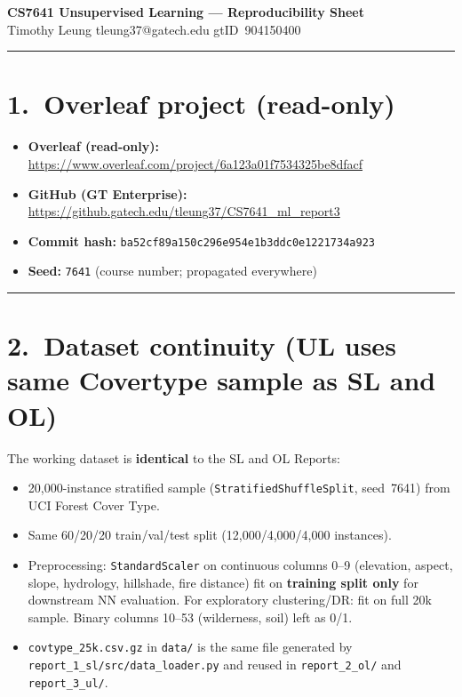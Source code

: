 \documentclass[11pt]{article}
\begin{document}
{\Large\bfseries\color{denimdark}
CS7641 Unsupervised Learning --- Reproducibility Sheet}\\[4pt]
{\large\color{denimmid}
Timothy Leung \quad tleung37@gatech.edu \quad gtID~904150400}\\[2pt]
{\color{denimmid}\rule{\linewidth}{0.6pt}}

\section*{1.\ Overleaf project (read-only)}
\begin{itemize}
  \item \textbf{Overleaf (read-only):}
        \url{https://www.overleaf.com/project/6a123a01f7534325be8dfacf}
  \item \textbf{GitHub (GT Enterprise):}
        \url{https://github.gatech.edu/tleung37/CS7641_ml_report3}
  \item \textbf{Commit hash:} \texttt{ba52cf89a150c296e954e1b3ddc0e1221734a923}
  \item \textbf{Seed:} \texttt{7641} (course number; propagated everywhere)
\end{itemize}

{\color{denimmid}\rule{\linewidth}{0.4pt}}

\section*{2.\ Dataset continuity (UL uses same Covertype sample as SL and OL)}

The working dataset is \textbf{identical} to the SL and OL Reports:
\begin{itemize}
  \item 20,000-instance stratified sample (\texttt{StratifiedShuffleSplit},
        seed~7641) from UCI Forest Cover Type.
  \item Same 60/20/20 train/val/test split (12,000/4,000/4,000 instances).
  \item Preprocessing: \texttt{StandardScaler} on continuous columns 0--9
        (elevation, aspect, slope, hydrology, hillshade, fire distance)
        fit on \textbf{training split only} for downstream NN evaluation.
        For exploratory clustering/DR: fit on full 20k sample.
        Binary columns 10--53 (wilderness, soil) left as 0/1.
  \item \texttt{covtype\_25k.csv.gz} in \texttt{data/} is the same file
        generated by \texttt{report\_1\_sl/src/data\_loader.py} and reused
        in \texttt{report\_2\_ol/} and \texttt{report\_3\_ul/}.
\end{itemize}
\end{document}

